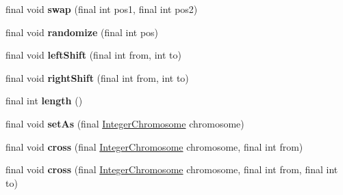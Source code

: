 \begin{CompactItemize}
\item 
\hypertarget{classjenes_1_1chromosome_1_1_integer_chromosome_2a591c336fedcfd457d4d874a2db328e}{
final void \textbf{swap} (final int pos1, final int pos2)}
\label{classjenes_1_1chromosome_1_1_integer_chromosome_2a591c336fedcfd457d4d874a2db328e}

\item 
\hypertarget{classjenes_1_1chromosome_1_1_integer_chromosome_5f05ea95b9e86f784f6f1bdff3cbfe54}{
final void \textbf{randomize} (final int pos)}
\label{classjenes_1_1chromosome_1_1_integer_chromosome_5f05ea95b9e86f784f6f1bdff3cbfe54}

\item 
\hypertarget{classjenes_1_1chromosome_1_1_integer_chromosome_8a05522811de03e5ea9fff08385ac306}{
final void \textbf{leftShift} (final int from, int to)}
\label{classjenes_1_1chromosome_1_1_integer_chromosome_8a05522811de03e5ea9fff08385ac306}

\item 
\hypertarget{classjenes_1_1chromosome_1_1_integer_chromosome_361afe717a58a8b47316e62178b387f5}{
final void \textbf{rightShift} (final int from, int to)}
\label{classjenes_1_1chromosome_1_1_integer_chromosome_361afe717a58a8b47316e62178b387f5}

\item 
\hypertarget{classjenes_1_1chromosome_1_1_integer_chromosome_8e44ab8d05b2632e72c209c641f10073}{
final int \textbf{length} ()}
\label{classjenes_1_1chromosome_1_1_integer_chromosome_8e44ab8d05b2632e72c209c641f10073}

\item 
\hypertarget{classjenes_1_1chromosome_1_1_integer_chromosome_65b39a2a6ef3deb1cb107b7f474bcbb0}{
final void \textbf{setAs} (final \hyperlink{classjenes_1_1chromosome_1_1_integer_chromosome}{IntegerChromosome} chromosome)}
\label{classjenes_1_1chromosome_1_1_integer_chromosome_65b39a2a6ef3deb1cb107b7f474bcbb0}

\item 
\hypertarget{classjenes_1_1chromosome_1_1_integer_chromosome_36acf5fbdfbb8a2718ade474188248d4}{
final void \textbf{cross} (final \hyperlink{classjenes_1_1chromosome_1_1_integer_chromosome}{IntegerChromosome} chromosome, final int from)}
\label{classjenes_1_1chromosome_1_1_integer_chromosome_36acf5fbdfbb8a2718ade474188248d4}

\item 
\hypertarget{classjenes_1_1chromosome_1_1_integer_chromosome_dfb0865b40586caf2d78a7d2d58c7796}{
final void \textbf{cross} (final \hyperlink{classjenes_1_1chromosome_1_1_integer_chromosome}{IntegerChromosome} chromosome, final int from, final int to)}
\label{classjenes_1_1chromosome_1_1_integer_chromosome_dfb0865b40586caf2d78a7d2d58c7796}


\end{CompactItemize}
